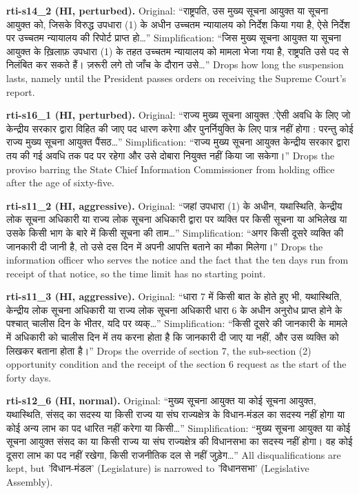 \documentclass[conference]{IEEEtran}
\newcommand{\dev}[1]{{\devfont #1}}
\begin{document}
{\noindent\textbf{rti-s14\_2 (HI, perturbed).} Original: ``\dev{राष्ट्रपति, उस मुख्य सूचना आयुक्त या सूचना आयुक्त को, जिसके विरुद्ध उपधारा (1) के अधीन उच्चतम न्यायालय को निर्देश किया गया है, ऐसे निर्देश पर उच्चतम न्यायालय की रिपोर्ट प्राप्त हो}…'' Simplification: ``\dev{जिस मुख्य सूचना आयुक्त या सूचना आयुक्त के ख़िलाफ़ उपधारा (1) के तहत उच्चतम न्यायालय को मामला भेजा गया है, राष्ट्रपति उसे पद से निलंबित कर सकते हैं। ज़रूरी लगे तो जाँच के दौरान उसे}…'' Drops how long the suspension lasts, namely until the President passes orders on receiving the Supreme Court's report.

\noindent\textbf{rti-s16\_1 (HI, perturbed).} Original: ``\dev{राज्य मुख्य सूचना आयुक्त .'ऐसी अवधि के लिए जो केन्द्रीय सरकार द्वारा विहित की जाए पद धारण करेगा और पुनर्नियुक्ति के लिए पात्र नहीं होगा : परन्तु कोई राज्य मुख्य सूचना आयुक्त पैंसठ}…'' Simplification: ``\dev{राज्य मुख्य सूचना आयुक्त केन्द्रीय सरकार द्वारा तय की गई अवधि तक पद पर रहेगा और उसे दोबारा नियुक्त नहीं किया जा सकेगा।}'' Drops the proviso barring the State Chief Information Commissioner from holding office after the age of sixty-five.

\noindent\textbf{rti-s11\_2 (HI, aggressive).} Original: ``\dev{जहां उपधारा (1) के अधीन, यथास्थिति, केन्द्रीय लोक सूचना अधिकारी या राज्य लोक सूचना अधिकारी द्वारा पर व्यक्ति पर किसी सूचना या अभिलेख या उसके किसी भाग के बारे में किसी सूचना की ताम}…'' Simplification: ``\dev{अगर किसी दूसरे व्यक्ति की जानकारी दी जानी है, तो उसे दस दिन में अपनी आपत्ति बताने का मौका मिलेगा।}'' Drops the information officer who serves the notice and the fact that the ten days run from receipt of that notice, so the time limit has no starting point.

\noindent\textbf{rti-s11\_3 (HI, aggressive).} Original: ``\dev{धारा 7 में किसी बात के होते हुए भी, यथास्थिति, केन्द्रीय लोक सूचना अधिकारी या राज्य लोक सूचना अधिकारी धारा 6 के अधीन अनुरोध प्राप्त होने के पश्चात् चालीस दिन के भीतर, यदि पर व्यक्}…'' Simplification: ``\dev{किसी दूसरे की जानकारी के मामले में अधिकारी को चालीस दिन में तय करना होता है कि जानकारी दी जाए या नहीं, और उस व्यक्ति को लिखकर बताना होता है।}'' Drops the override of section 7, the sub-section (2) opportunity condition and the receipt of the section 6 request as the start of the forty days.

\noindent\textbf{rti-s12\_6 (HI, normal).} Original: ``\dev{मुख्य सूचना आयुक्त या कोई सूचना आयुक्त, यथास्थिति, संसद् का सदस्य या किसी राज्य या संघ राज्यक्षेत्र के विधान-मंडल का सदस्य नहीं होगा या कोई अन्य लाभ का पद धारित नहीं करेगा या किसी}…'' Simplification: ``\dev{मुख्य सूचना आयुक्त या कोई सूचना आयुक्त संसद का या किसी राज्य या संघ राज्यक्षेत्र की विधानसभा का सदस्य नहीं होगा। वह कोई दूसरा लाभ का पद नहीं रखेगा, किसी राजनीतिक दल से नहीं जुड़ेग}…'' All disqualifications are kept, but '\dev{विधान-मंडल}' (Legislature) is narrowed to '\dev{विधानसभा}' (Legislative Assembly).

}
\end{document}
